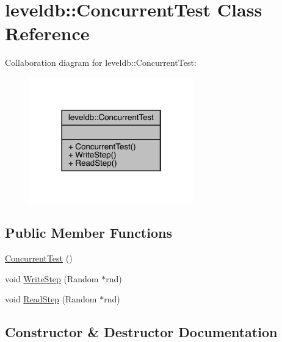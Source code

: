 \hypertarget{classleveldb_1_1_concurrent_test}{}\section{leveldb\+::Concurrent\+Test Class Reference}
\label{classleveldb_1_1_concurrent_test}


Collaboration diagram for leveldb\+::Concurrent\+Test\+:
\nopagebreak
\begin{figure}[H]
\begin{center}
\leavevmode
\includegraphics[width=201pt]{classleveldb_1_1_concurrent_test__coll__graph}
\end{center}
\end{figure}
\subsection*{Public Member Functions}
\begin{DoxyCompactItemize}
\item 
\mbox{\hyperlink{classleveldb_1_1_concurrent_test_acd93a8fa57d9a10871ec24c419f5ea88}{Concurrent\+Test}} ()
\item 
void \mbox{\hyperlink{classleveldb_1_1_concurrent_test_a43dc8afb9124c364d6e97dc3d421131f}{Write\+Step}} (Random $\ast$rnd)
\item 
void \mbox{\hyperlink{classleveldb_1_1_concurrent_test_a9dcaf11ec747ad37150526f891627c50}{Read\+Step}} (Random $\ast$rnd)
\end{DoxyCompactItemize}


\subsection{Constructor \& Destructor Documentation}
\mbox{\label{classleveldb_1_1_concurrent_test_acd93a8fa57d9a10871ec24c419f5ea88}} 
